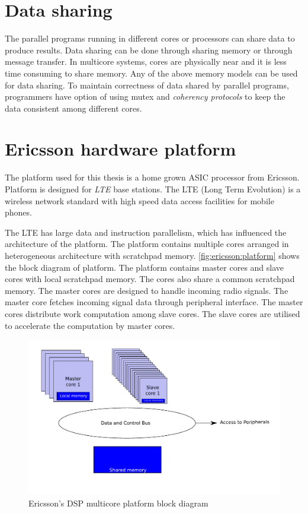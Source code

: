 \section{Data sharing}

The parallel programs running in different cores or processors can share data to produce results. Data sharing can be done through sharing memory or through message transfer. In multicore systems, cores are physically near and it is less time consuming to share memory. Any of the above memory models can be used for data sharing. To maintain correctness of data shared by parallel programs, programmers have option of using mutex and \emph{coherency protocols} to keep the data consistent among different cores.

\ifericsson
\section{Ericsson hardware platform}

The platform used for this thesis is a home grown ASIC processor from Ericsson. Platform is designed for \emph{LTE} base stations. The LTE (Long Term Evolution)  is a wireless network standard with high speed data access facilities for mobile phones.

The LTE has large data and instruction parallelism, which has influenced the architecture of the platform. The platform contains multiple cores arranged in heterogeneous architecture with scratchpad memory. \autoref{fig:ericsson:platform} shows the block diagram of platform. The platform contains master cores and slave cores with local scratchpad memory. The cores also share a common scratchpad memory. The master cores are designed to handle incoming radio signals. The master core fetches incoming signal data through peripheral interface. The master cores distribute work computation among slave cores. The slave cores are utilised to accelerate the computation by master cores.



\begin{figure}
\centering
\includegraphics[scale=0.8]{images/EricssonArchitecture.pdf}

    \caption{Ericsson's DSP multicore platform block diagram}
    \label{fig:ericsson:platform}

\end{figure}



\fi





